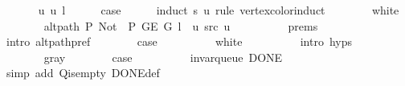 \begin{isabellebody}
\isanewline
\ \ \ \ \isamarkupfalse%
\ {\isacharparenleft}{\kern0pt}{}\ u\ u{\isacharprime}{\kern0pt}\ l{\isacharparenright}{\kern0pt}\isanewline
\ \ \ \ \isamarkupfalse%
\ {\isacharquery}{\kern0pt}case\isanewline
\ \ \ \ \isamarkupfalse%
\ {\isacharparenleft}{\kern0pt}induct\ s\ u\ rule{\isacharcolon}{\kern0pt}\ vertex{\isacharunderscore}{\kern0pt}color{\isacharunderscore}{\kern0pt}induct{\isacharparenright}{\kern0pt}\isanewline
\ \ \ \ \ \ \isamarkupfalse%
\ white\isanewline
\ \ \ \ \ \ \isamarkupfalse%
\ {\isachardoublequoteopen}alt{\isacharunderscore}{\kern0pt}path\ P{\isacharprime}{\kern0pt}{\isacharprime}{\kern0pt}\ {\isacharparenleft}{\kern0pt}Not\ {\isasymcirc}\ P{\isacharprime}{\kern0pt}{\isacharprime}{\kern0pt}{\isacharparenright}{\kern0pt}\ {\isacharparenleft}{\kern0pt}G{\isachardot}{\kern0pt}E\ G{\isacharparenright}{\kern0pt}\ {\isacharparenleft}{\kern0pt}l\ {\isacharat}{\kern0pt}\ {\isacharbrackleft}{\kern0pt}u{\isacharbrackright}{\kern0pt}{\isacharparenright}{\kern0pt}\ src\ u{\isachardoublequoteclose}\isanewline
\ \ \ \ \ \ \ \ \isamarkupfalse%
\ {\isachardoublequoteopen}{}{\isachardot}{\kern0pt}prems{\isachardoublequoteclose}{\isacharparenleft}{\kern0pt}{}{\isacharparenright}{\kern0pt}\isanewline
\ \ \ \ \ \ \ \ \isamarkupfalse%
\ {\isacharparenleft}{\kern0pt}intro\ alt{\isacharunderscore}{\kern0pt}path{\isacharunderscore}{\kern0pt}pref{\isacharparenright}{\kern0pt}\isanewline
\ \ \ \ \ \ \isamarkupfalse%
\ {\isacharquery}{\kern0pt}case\isanewline
\ \ \ \ \ \ \ \ \isamarkupfalse%
\ white\isanewline
\ \ \ \ \ \ \ \ \isamarkupfalse%
\ {\isacharparenleft}{\kern0pt}intro\ {\isachardoublequoteopen}{}{\isachardot}{\kern0pt}hyps{\isachardoublequoteclose}{\isacharparenright}{\kern0pt}\isanewline
\ \ \ \ \isamarkupfalse%
\isanewline
\ \ \ \ \ \ \isamarkupfalse%
\ gray\isanewline
\ \ \ \ \ \ \isamarkupfalse%
\ {\isacharquery}{\kern0pt}case\isanewline
\ \ \ \ \ \ \ \ \isamarkupfalse%
\ invar{\isacharunderscore}{\kern0pt}queue\ DONE\isanewline
\ \ \ \ \ \ \ \ \isamarkupfalse%
\ {\isacharparenleft}{\kern0pt}simp\ add{\isacharcolon}{\kern0pt}\ Q{\isachardot}{\kern0pt}is{\isacharunderscore}{\kern0pt}empty\ DONE{\isacharunderscore}{\kern0pt}def{\isacharparenright}{\kern0pt}\isanewline
\ \ \ \ \isamarkupfalse%
\isanewline
\ \ \ \ \ \ \isamarkupfalse%

\end{isabellebody}
